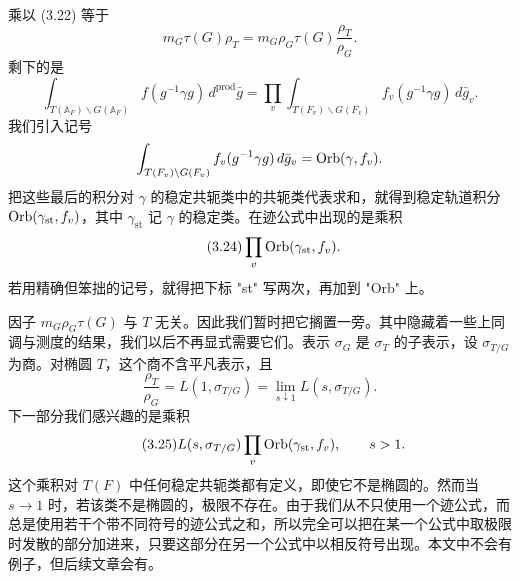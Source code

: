 乘以 (3.22) 等于
\begin{equation}\tag{3.23}
m_G\tau(G)\rho_T=m_G\rho_G\tau(G)\frac{\rho_T}{\rho_G}.
\end{equation}
剩下的是
\[
\int_{T(\mathbb A_F)\backslash G(\mathbb A_F)}f(g^{-1}\gamma g)\,d^{\mathrm{prod}}\bar g
=\prod_v\int_{T(F_v)\backslash G(F_v)}f_v(g^{-1}\gamma g)\,d\bar g_v.
\]
我们引入记号
\[
\int_{T(F_v)\backslash G(F_v)}f_v(g^{-1}\gamma g)\,d\bar g_v=\mathrm{Orb}(\gamma,f_v).
\]
把这些最后的积分对 $\gamma$ 的稳定共轭类中的共轭类代表求和，就得到稳定轨道积分 $\mathrm{Orb}(\gamma_{\mathrm{st}},f_v)$，其中 $\gamma_{\mathrm{st}}$ 记 $\gamma$ 的稳定类。在迹公式中出现的是乘积
\begin{equation}\tag{3.24}
\prod_v\mathrm{Orb}(\gamma_{\mathrm{st}},f_v).
\end{equation}
若用精确但笨拙的记号，就得把下标 "st" 写两次，再加到 "Orb" 上。

因子 $m_G\rho_G\tau(G)$ 与 $T$ 无关。因此我们暂时把它搁置一旁。其中隐藏着一些上同调与测度的结果，我们以后不再显式需要它们。表示 $\sigma_G$ 是 $\sigma_T$ 的子表示，设 $\sigma_{T/G}$ 为商。对椭圆 $T$，这个商不含平凡表示，且
\[
\frac{\rho_T}{\rho_G}=L(1,\sigma_{T/G})=\lim_{s\downarrow1}L(s,\sigma_{T/G}).
\]
下一部分我们感兴趣的是乘积
\begin{equation}\tag{3.25}
L(s,\sigma_{T/G})\prod_v\mathrm{Orb}(\gamma_{\mathrm{st}},f_v),
\qquad s>1.
\end{equation}
这个乘积对 $T(F)$ 中任何稳定共轭类都有定义，即使它不是椭圆的。然而当 $s\to1$ 时，若该类不是椭圆的，极限不存在。由于我们从不只使用一个迹公式，而总是使用若干个带不同符号的迹公式之和，所以完全可以把在某一个公式中取极限时发散的部分加进来，只要这部分在另一个公式中以相反符号出现。本文中不会有例子，但后续文章会有。
